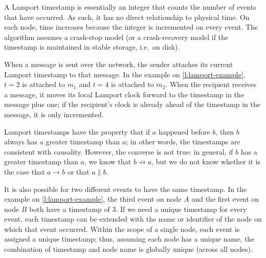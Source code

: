 A Lamport timestamp is essentially an integer that counts the number of events that have occurred.
As such, it has no direct relationship to physical time.
On each node, time increases because the integer is incremented on every event.
The algorithm assumes a crash-stop model (or a crash-recovery model if the timestamp is maintained in stable storage, i.e.\ on disk).

When a message is sent over the network, the sender attaches its current Lamport timestamp to that message.
In the example on \autoref{l:lamport-example}, $t=2$ is attached to $m_1$ and $t=4$ is attached to $m_2$.
When the recipient receives a message, it moves its local Lamport clock forward to the timestamp in the message plus one; if the recipient's clock is already ahead of the timestamp in the message, it is only incremented.

Lamport timestamps have the property that if $a$ happened before $b$, then $b$ always has a greater timestamp than $a$; in other words, the timestamps are consistent with causality.
However, the converse is not true: in general, if $b$ has a greater timestamp than $a$, we know that $b \not\rightarrow a$, but we do not know whether it is the case that $a \rightarrow b$ or that $a \parallel b$.

It is also possible for two different events to have the same timestamp.
In the example on \autoref{l:lamport-example}, the third event on node $A$ and the first event on node $B$ both have a timestamp of 3.
If we need a unique timestamp for every event, each timestamp can be extended with the name or identifier of the node on which that event occurred.
Within the scope of a single node, each event is assigned a unique timestamp; thus, assuming each node has a unique name, the combination of timestamp and node name is globally unique (across all nodes).


